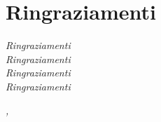 \cleardoublepage
{}
\thispagestyle{empty}


\begingroup
\let\clearpage\relax
\let\cleardoublepage\relax
\let\cleardoublepage\relax

\section*{Ringraziamenti}

\noindent \textit{Ringraziamenti}\\

\noindent \textit{Ringraziamenti}\\

\noindent \textit{Ringraziamenti}\\

\noindent \textit{Ringraziamenti}\\
\bigskip

\noindent\textit{\myLocation, \myTime}
\hfill \myName

\endgroup
